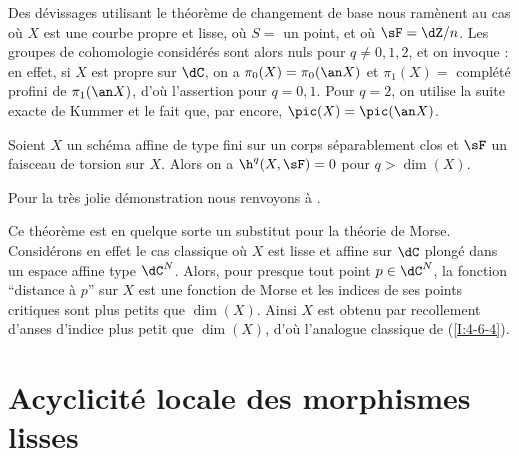 Des dévissages utilisant le théorème de changement de base nous ramènent au 
cas où $X$ est une courbe propre et lisse, où $S=$ un point, et où 
$\sF=\dZ/n$. Les groupes de cohomologie considérés sont alors nuls pour 
$q\ne 0,1,2$, et on invoque : en effet, si $X$ est propre sur $\dC$, 
on a $\pi_0(X) = \pi_0(\an X)$ et $\pi_1(X) = $ complété profini de 
$\pi_1(\an X)$, d'où l'assertion pour $q=0,1$. Pour $q=2$, on utilise la 
suite exacte de Kummer et le fait que, par  encore, 
$\pic(X)=\pic(\an X)$. 





\begin{theorem}\label{I:4-6-4}
Soient $X$ un schéma affine de type fini sur un corps séparablement clos et 
$\sF$ un faisceau de torsion sur $X$. Alors on a $\h^q(X,\sF) = 0$ pour 
$q>\dim(X)$. 
\end{theorem}

Pour la très jolie démonstration nous renvoyons à
. 





\begin{sourceexampledotdash}[Remarque]\label{I:4-6-5}

Ce théorème est en quelque sorte un substitut pour la théorie de Morse. 
Considérons en effet le cas classique où $X$ est lisse et affine sur $\dC$ 
plongé dans un espace affine type $\dC^N$. Alors, pour presque tout point 
$p\in\dC^N$, la fonction ``distance à $p$'' sur $X$ est une fonction de Morse 
et les indices de ses points critiques sont plus petits que $\dim(X)$. Ainsi 
$X$ est obtenu par recollement d'anses d'indice plus petit que $\dim(X)$, d'où 
l'analogue classique de (\ref{I:4-6-4}). 
\end{sourceexampledotdash}




















\section{Acyclicité locale des morphismes lisses}\label{I:5}

